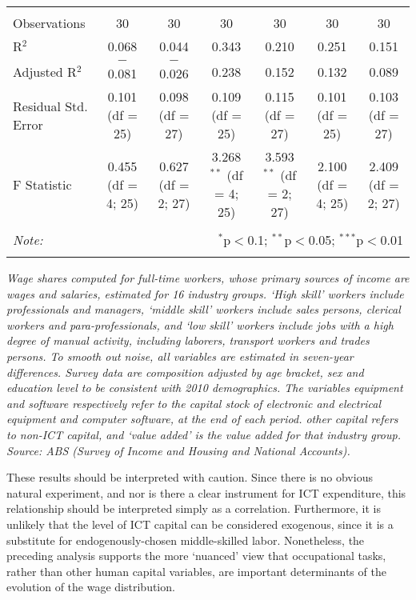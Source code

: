 \begin{sidewaystable}
\begin{center}
\begin{tabular}{@{\extracolsep{5pt}}lcccccc}
  & & & & & & \\ 
\hline \\[-1.8ex] 
Observations & 30 & 30 & 30 & 30 & 30 & 30 \\ 
R$^{2}$ & 0.068 & 0.044 & 0.343 & 0.210 & 0.251 & 0.151 \\ 
Adjusted R$^{2}$ & $-$0.081 & $-$0.026 & 0.238 & 0.152 & 0.132 & 0.089 \\ 
Residual Std. Error & 0.101 (df = 25) & 0.098 (df = 27) & 0.109 (df = 25) & 0.115 (df = 27) & 0.101 (df = 25) & 0.103 (df = 27) \\ 
F Statistic & 0.455 (df = 4; 25) & 0.627 (df = 2; 27) & 3.268$^{**}$ (df = 4; 25) & 3.593$^{**}$ (df = 2; 27) & 2.100 (df = 4; 25) & 2.409 (df = 2; 27) \\ 
\hline 
\hline \\[-1.8ex] 
\textit{Note:}  & \multicolumn{6}{r}{$^{*}$p$<$0.1; $^{**}$p$<$0.05; $^{***}$p$<$0.01} \\ 
\normalsize 
\end{tabular} 
\end{center}
{\em Wage shares computed for full-time workers, whose primary sources of income are wages and salaries, estimated for 16 industry groups. `High skill' workers include professionals and managers, `middle skill' workers include sales persons, clerical workers and para-professionals, and `low skill' workers include jobs with a high degree of manual activity, including laborers, transport workers and trades persons. To smooth out noise, all variables are estimated in seven-year differences. Survey data are composition adjusted by age bracket, sex and education level to be consistent with 2010 demographics. The variables {\em equipment} and {\em software} respectively refer to the capital stock of electronic and electrical equipment and computer software, at the end of each period. {\em other capital} refers to non-ICT capital, and {\em `value added'} is the value added for that industry group. Source: ABS (Survey of Income and Housing and National Accounts).}
\end{sidewaystable} 

These results should be interpreted with caution. Since there is no obvious natural experiment, and nor is there a clear instrument for ICT expenditure, this relationship should be interpreted simply as a correlation. Furthermore, it is unlikely that the level of ICT capital can be considered exogenous, since it is a substitute for endogenously-chosen middle-skilled labor. Nonetheless, the preceding analysis supports the more `nuanced' view that occupational tasks, rather than other human capital variables, are important determinants of the evolution of the wage distribution.

